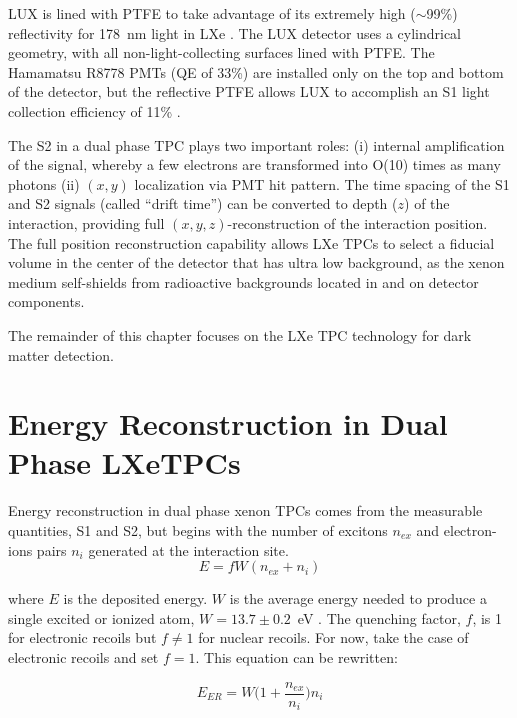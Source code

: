 \ac{LUX} is lined with \ac{PTFE} to take advantage of its extremely high ($\sim$99\%) reflectivity for 178~nm light in \ac{LXe} \cite{Neves2017}. The \ac{LUX} detector uses a cylindrical geometry, with all non-light-collecting surfaces lined with \ac{PTFE}. The Hamamatsu R8778 \ac{PMT}s (\ac{QE} of 33\%) are installed only on the top and bottom of the detector, but the reflective \ac{PTFE} allows \ac{LUX} to accomplish an S1 light collection efficiency of 11\% \cite{LUX:Run03Comprehensive}.

The S2 in a dual phase \ac{TPC} plays two important roles: (i) internal amplification of the signal, whereby a few electrons are transformed into O(10) times as many photons (ii) $(x,y)$ localization via \ac{PMT} hit pattern. The time spacing of the S1 and S2 signals (called ``drift time'') can be converted to depth ($z$) of the interaction, providing full $(x,y,z)$-reconstruction of the interaction position. The full position reconstruction capability allows \ac{LXe} \ac{TPC}s to select a fiducial volume in the center of the detector that has ultra low background, as the xenon medium self-shields from radioactive backgrounds located in and on detector components. 

The remainder of this chapter focuses on the \ac{LXe} \ac{TPC} technology for dark matter detection. 

\FloatBarrier
\section{Energy Reconstruction in Dual Phase LXeTPCs}
\label{sec:energy_reconstruction}
Energy reconstruction in dual phase xenon \ac{TPC}s comes from the measurable quantities, S1 and S2, but begins with the number of excitons $n_{ex}$  and electron-ions pairs $n_{i}$ generated at the interaction site. 
\begin{equation}
E = f W (n_{ex} + n_{i} )
\end{equation}

where $E$ is the deposited energy. $W$ is the average energy needed to produce a single excited or ionized atom, $W = 13.7 \pm 0.2$~eV \cite{Mock2014}. The quenching factor, $f$, is 1 for electronic recoils but $f \neq 1$ for nuclear recoils. For now, take the case of electronic recoils and set $f=1$. This equation can be rewritten:

\begin{equation}
E_{ER} = W \Big(1 + \frac{n_{ex}}{n_{i}} \Big) n_{i}
\end{equation}

